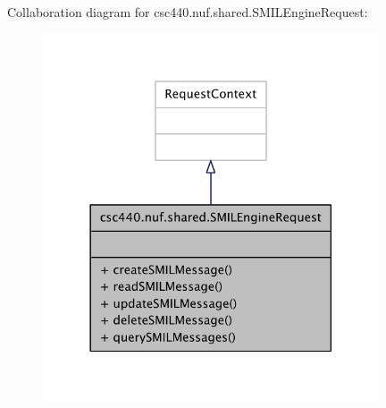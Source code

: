 Collaboration diagram for csc440.\-nuf.\-shared.\-S\-M\-I\-L\-Engine\-Request\-:
\nopagebreak
\begin{figure}[H]
\begin{center}
\leavevmode
\includegraphics[width=282pt]{interfacecsc440_1_1nuf_1_1shared_1_1_s_m_i_l_engine_request__coll__graph}
\end{center}
\end{figure}

